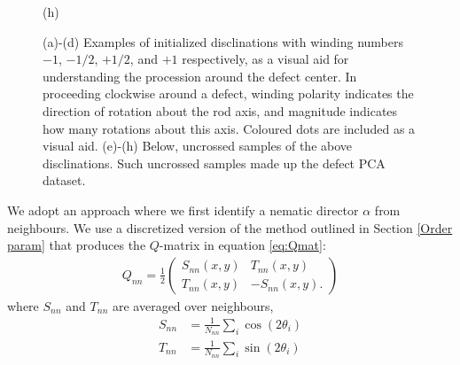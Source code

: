 \begin{figure}[!t]
\begin{minipage}[t]{0.25\textwidth}
		(h)
	\end{minipage}%
	\caption{(a)-(d) Examples of initialized disclinations with winding numbers $-1$, $-1/2$, $+1/2$, and $+1$ respectively, as a visual aid for understanding the procession around the defect center. In proceeding clockwise around a defect, winding polarity indicates the direction of rotation about the rod axis, and magnitude indicates how many rotations about this axis. Coloured dots are included as a visual aid. (e)-(h) Below, uncrossed samples of the above disclinations. Such uncrossed samples made up the defect PCA dataset.
	}
	\label{FIG:defects_pure}
\end{figure}

We adopt an approach where we first identify a nematic director $\alpha$ from neighbours. We use a discretized version of the method outlined in Section \ref{Order param} that produces the $Q$-matrix in equation \ref{eq:Qmat}:
\begin{align*}
	Q_{nn} = \frac{1}{2}\left(
	\begin{matrix}
	S_{nn}(x,y) & T_{nn}(x,y)\\
	T_{nn}(x,y) & -S_{nn}(x,y).
	\end{matrix}
	\right)
\end{align*}
where $S_{nn}$ and $T_{nn}$ are averaged over neighbours,
\begin{align*}
	S_{nn} &= \frac{1}{N_{nn}}\sum_i \cos(2\theta_i)\\
	T_{nn} &= \frac{1}{N_{nn}}\sum_i \sin(2\theta_i)
\end{align*} 











